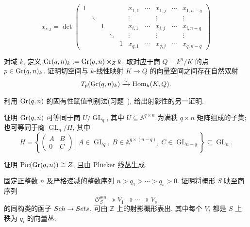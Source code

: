 \[
x_{i,j}=\det
\left(\begin{array}{ccccc|ccccc}
1&&&&&x_{1,1}&\cdots&x_{1,j}&\cdots&x_{1,n-q}\\
&\ddots&&&&\vdots&&\vdots&&\vdots\\
&&1&&&x_{i,1}&\cdots&x_{i,j}&\cdots&x_{i,n-q}\\
&&&\ddots&&\vdots&&\vdots&&\vdots\\
&&&&1&x_{q,1}&\cdots&x_{q,j}&\cdots&x_{q,n-q}
\end{array}\right)
\]
\begin{exercise}[适合练习]\label{src:2.2.10}
对域 $k$, 定义 $\operatorname{Gr}(q,n)_k:=\operatorname{Gr}(q,n)\times_{Z}k$, 取对应于商 $Q=k^n/K$ 的点 $p\in\operatorname{Gr}(q,n)_k$.
证明切空间与 $k$-线性映射 $K\to Q$ 的向量空间之间存在自然双射
\[
T_p(\operatorname{Gr}(q,n)_k)\xrightarrow{\sim}\operatorname{Hom}_k(K,Q).
\]
\end{exercise}
\begin{exercise}[适合练习]\label{src:2.2.11}
利用 $\operatorname{Gr}(q,n)$ 的固有性赋值判别法(习题~), 给出射影性的另一证明.
\end{exercise}
\begin{exercise}[困难]\label{src:2.2.12}
证明 $\operatorname{Gr}(q,n)$ 可等同于商 $U/\operatorname{GL}_q$, 其中 $U\subseteq\mathbb A^{q\times n}$ 为满秩 $q\times n$ 矩阵组成的子集; 也可等同于商 $\operatorname{GL}_n/H$, 其中
\[
H=\left\{\left.
\begin{pmatrix}A&B\\0&C\end{pmatrix}
\ \right|\ A\in\operatorname{GL}_q,\ B\in\mathbb A^{q\times(n-q)},\
C\in\operatorname{GL}_{n-q}\right\}\subseteq\operatorname{GL}_n.
\]
\end{exercise}
\begin{exercise}[困难]\label{src:2.2.13}
证明 $\operatorname{Pic}(\operatorname{Gr}(q,n))\cong Z$, 且由 Plücker 线丛生成.
\end{exercise}
\begin{exercise}[旗簇]\label{src:2.2.14}
固定正整数 $n$ 及严格递减的整数序列 $n>q_1>\cdots>q_s>0$.
证明将概形 $S$ 映至商序列
\[
\mathcal O_S^{\oplus n}\twoheadrightarrow V_1\twoheadrightarrow
\cdots\twoheadrightarrow V_s
\]
的同构类的函子 $Sch\to Sets$, 可由 $\mathbb Z$ 上的射影概形表出, 其中每个 $V_i$ 都是 $S$ 上秩为 $q_i$ 的向量丛.
\end{exercise}
